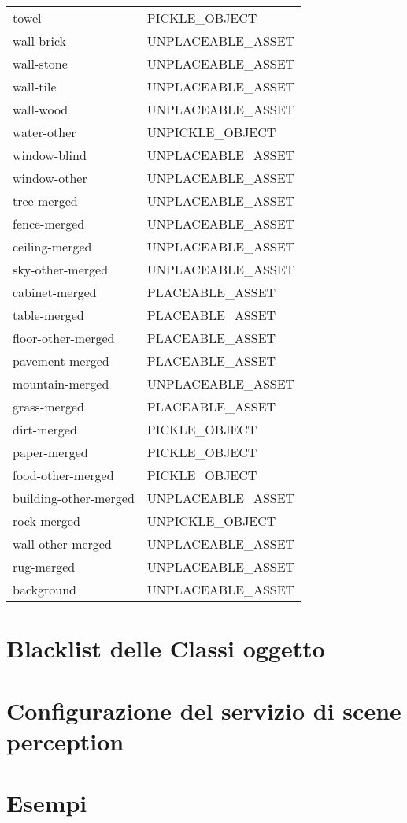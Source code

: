 \begin{supertabular}{|l|l|}
  towel                 & \tiny{PICKLE\_OBJECT    } \\
  wall-brick            & \tiny{UNPLACEABLE\_ASSET} \\
  wall-stone            & \tiny{UNPLACEABLE\_ASSET} \\
  wall-tile             & \tiny{UNPLACEABLE\_ASSET} \\
  wall-wood             & \tiny{UNPLACEABLE\_ASSET} \\
  water-other           & \tiny{UNPICKLE\_OBJECT  } \\
  window-blind          & \tiny{UNPLACEABLE\_ASSET} \\
  window-other          & \tiny{UNPLACEABLE\_ASSET} \\
  tree-merged           & \tiny{UNPLACEABLE\_ASSET} \\
  fence-merged          & \tiny{UNPLACEABLE\_ASSET} \\
  ceiling-merged        & \tiny{UNPLACEABLE\_ASSET} \\
  sky-other-merged      & \tiny{UNPLACEABLE\_ASSET} \\
  cabinet-merged        & \tiny{PLACEABLE\_ASSET  } \\
  table-merged          & \tiny{PLACEABLE\_ASSET  } \\
  floor-other-merged    & \tiny{PLACEABLE\_ASSET  } \\
  pavement-merged       & \tiny{PLACEABLE\_ASSET  } \\
  mountain-merged       & \tiny{UNPLACEABLE\_ASSET} \\
  grass-merged          & \tiny{PLACEABLE\_ASSET  } \\
  dirt-merged           & \tiny{PICKLE\_OBJECT    } \\
  paper-merged          & \tiny{PICKLE\_OBJECT    } \\
  food-other-merged     & \tiny{PICKLE\_OBJECT    } \\
  building-other-merged & \tiny{UNPLACEABLE\_ASSET} \\
  rock-merged           & \tiny{UNPICKLE\_OBJECT  } \\
  wall-other-merged     & \tiny{UNPLACEABLE\_ASSET} \\
  rug-merged            & \tiny{UNPLACEABLE\_ASSET} \\
  background            & \tiny{UNPLACEABLE\_ASSET} \\
\end{supertabular}
\pagebreak
\onecolumn


\section{Blacklist delle Classi oggetto}

\section{Configurazione del servizio di scene perception}

\section{Esempi}